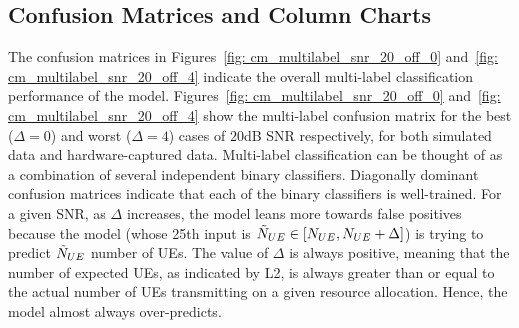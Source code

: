 \documentclass[journal]{IEEEtran}
\begin{document}
\subsection{Confusion Matrices and Column Charts}
The confusion matrices in Figures~\ref{fig: cm_multilabel_snr_20_off_0} and~\ref{fig: cm_multilabel_snr_20_off_4} indicate the overall multi-label classification performance of the model. Figures~\ref{fig: cm_multilabel_snr_20_off_0} and~\ref{fig: cm_multilabel_snr_20_off_4} show the multi-label confusion matrix for the best ($\Delta = 0$) and worst ($\Delta = 4$) cases of $20$dB SNR respectively, for both simulated data and hardware-captured data. Multi-label classification can be thought of as a combination of several independent binary classifiers. Diagonally dominant confusion matrices indicate that each of the binary classifiers is well-trained. For a given SNR, as $\Delta$ increases, the model leans more towards false positives because the model (whose 25th input is $\Tilde{N}_{UE} \in [N_{UE}, N_{UE} + \Delta]$) is trying to predict $\Tilde{N}_{UE}$ number of UEs. The value of $\Delta$ is always positive, meaning that the number of expected UEs, as indicated by L2, is always greater than or equal to the actual number of UEs transmitting on a given resource allocation. Hence, the model almost always over-predicts. 
\end{document}

